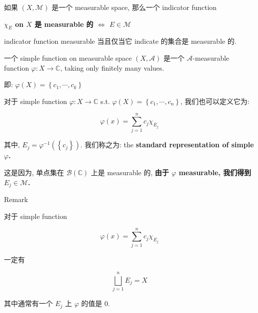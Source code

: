 \begin{lemma}

如果 \((X,\mathcal{M})\) 是一个 measurable space, 那么一个 indicator function

\textbf{\(\chi_{E}\) on \(X\) 是 measurable 的 \(\Leftrightarrow\) \(E \in \mathcal{M}\)}

\end{lemma}

indicator function measurable 当且仅当它 indicate 的集合是 measurable 的.

\begin{definition}{}

一个 simple function on measurable space \((X,\mathcal{A})\) 是一个 \(\mathcal{A}\)-measurable function \(\varphi:X\rightarrow\mathbb{C}\), taking only finitely many values.

即: \(\varphi(X) = \left\{ {c_{1},\cdots,c_{k}} \right\}\)

\end{definition}

\begin{proposition}{}

对于 simple function \(\varphi:X\rightarrow\mathbb{C}\) s.t. \(\varphi(X) = \left\{ {c_{1},\cdots,c_{n}} \right\}\), 我们也可以定义它为:

\[\varphi(x) = \sum\limits_{j = 1}^{n}c_{j}\chi_{E_{j}}\]

其中, \(E_{j} = \varphi^{- 1}(\left\{ c_{j} \right\})\). 我们称之为: the \textbf{standard representation of simple \(\varphi\).}

\end{proposition}

这是因为, 单点集在 \(\mathcal{B}(\mathbb{C})\) 上是 measurable 的, \textbf{由于 \(\varphi\) measurable, 我们得到 \(E_{j} \in \mathcal{M}\).}

\begin{qlremark}{Remark}

对于 simple function

\[\varphi(x) = \sum\limits_{j = 1}^{n}c_{j}\chi_{E_{j}}\]

一定有

\[\bigsqcup\limits_{j = 1}^{n}E_{j} = X\]

其中通常有一个 \(E_{j}\) 上 \(\varphi\) 的值是 0.

\end{qlremark}

